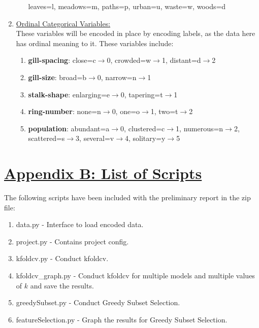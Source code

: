 \documentclass[fleqn]{article}
\begin{document}
\begin{enumerate}
\begin{enumerate}[label=\roman*.]
                leaves=l,
                meadows=m,
                paths=p,
                urban=u,
                waste=w,
                woods=d
        \end{enumerate}
        \item \underline{Ordinal Categorical Variables:}\\
        These variables will be encoded in place by encoding labels, as the data here has
        ordinal meaning to it. These variables include:
        \begin{enumerate}[label=\roman*.]
            \item \textbf{gill-spacing}:
                close=c$\to$0,
                crowded=w$\to$1,
                distant=d$\to$2
            \item \textbf{gill-size}:
                broad=b$\to$0,
                narrow=n$\to$1
            \item \textbf{stalk-shape}:
                enlarging=e$\to$0,
                tapering=t$\to$1
            \item \textbf{ring-number}:
                none=n$\to$0,
                one=o$\to$1,
                two=t$\to$2
            \item \textbf{population}:
                abundant=a$\to$0,
                clustered=c$\to$1,
                numerous=n$\to$2,
                scattered=s$\to$3,
                several=v$\to$4,
                solitary=y$\to$5
        \end{enumerate}
    \end{enumerate}

    \newpage
    \section*{\underline{Appendix B: List of Scripts}}
    The following scripts have been included with the preliminary report in the zip file:
    \begin{enumerate}
        \item data.py - Interface to load encoded data.
        \item project.py - Contains project config.
        \item kfoldcv.py - Conduct kfoldcv.
        \item kfoldcv\_graph.py - Conduct kfoldcv for multiple models and multiple values
        of $k$ and save the results.
        \item greedySubset.py - Conduct Greedy Subset Selection.
        \item featureSelection.py - Graph the results for Greedy Subset Selection.
    \end{enumerate}
\end{document}
